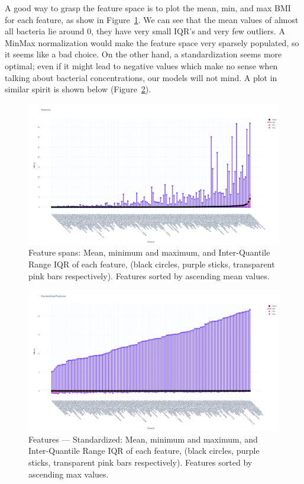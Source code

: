 \documentclass[12pt]{article}
\begin{document}
A good way to grasp the feature space is to plot the mean, min, and max BMI
for each feature, as show in Figure~\ref{fig:feature_spans}. We can see that the
mean values of almost all bacteria lie around $0$, they have very small IQR's and
very few outliers. A MinMax normalization would make the feature space very sparsely
populated, so it seems like a bad choice. On the other hand, a standardization
seems more optimal; even if it might lead to negative values which make no sense
when talking about bacterial concentrations, our models will not mind. A plot
in similar spirit is shown below (Figure~\ref{fig:feature_standardized}).

\begin{figure}[H]
    \centering
    \includegraphics[width=\textwidth]{ims/features_spans.png}
    \caption{Feature spans: Mean, minimum and maximum, and Inter-Quantile Range IQR
    of each feature, (black circles, purple sticks, transparent pink bars
    respectively). Features sorted by ascending mean values.}
    \label{fig:feature_spans}
\end{figure}

\begin{figure}[H]
    \centering
    \includegraphics[width=\textwidth]{ims/features_standardized.png}
    \caption{Features --- Standardized: Mean, minimum and maximum, and Inter-Quantile
    Range IQR of each feature, (black circles, purple sticks, transparent pink bars
    respectively). Features sorted by ascending max values.}
    \label{fig:feature_standardized}
\end{figure}
\end{document}
